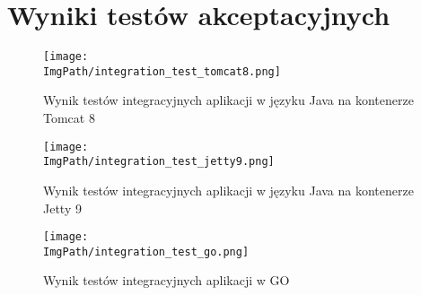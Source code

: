 \appendix
\chapter{Wyniki testów akceptacyjnych}
\label{sec:acceptance_tests_appendix}
\begin{figure}[!htb]
\hspace*{-4cm}
\texttt{[image: \\ImgPath/integration\_test\_tomcat8.png]}
\caption{Wynik testów integracyjnych aplikacji w języku Java na kontenerze Tomcat 8}
\label{fig:acceptance_test_tomcat}
\end{figure}

\newpage
\begin{figure}[!ht]
\centering
\hspace*{-4cm}
\texttt{[image: \\ImgPath/integration\_test\_jetty9.png]}
\caption{Wynik testów integracyjnych aplikacji w języku Java na kontenerze Jetty 9}
\label{fig:acceptance_test_jetty}
\end{figure}

\newpage
\begin{figure}[!ht]
\centering
\hspace*{-4cm}
\texttt{[image: \\ImgPath/integration\_test\_go.png]}
\caption{Wynik testów integracyjnych aplikacji w GO}
\label{fig:acceptance_test_go}
\end{figure}